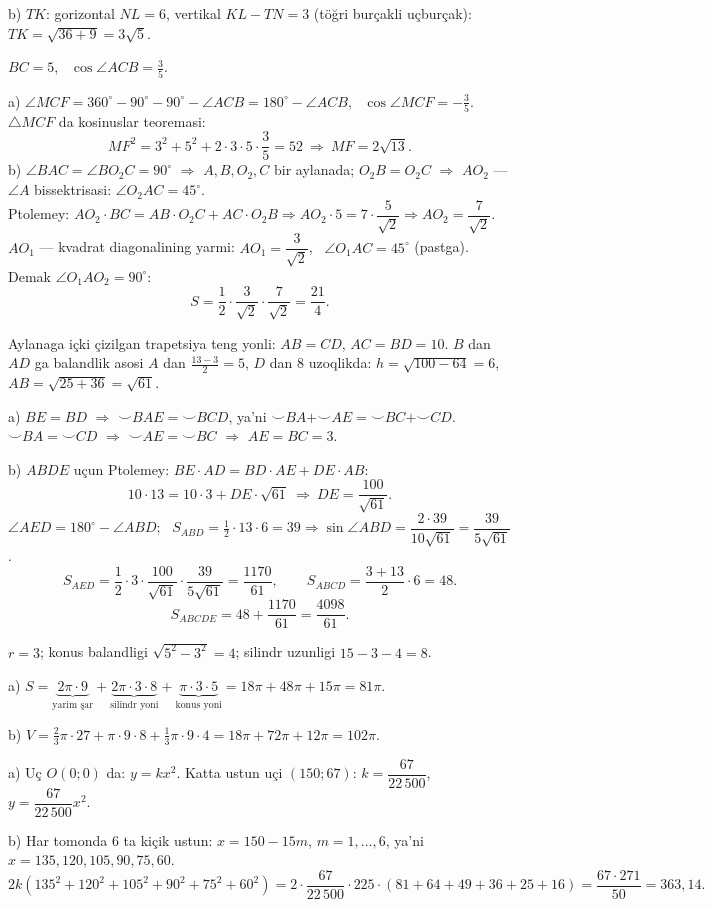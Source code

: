 b) $TK$: gorizontal $NL=6$, vertikal $KL-TN=3$ (\textcolor{aux}{töğri burçakli uçburçak}): \ $TK=\sqrt{36+9}=3\sqrt5$.

\newpage
{}
$BC=5$, \ $\cos\angle ACB=\frac35$.

a) $\angle MCF=360^\circ-90^\circ-90^\circ-\angle ACB=180^\circ-\angle ACB$, \ $\cos\angle MCF=-\frac35$. $\triangle MCF$ da kosinuslar teoremasi:
\[MF^2=3^2+5^2+2\cdot3\cdot5\cdot\frac35=52\ \Rightarrow\ MF=2\sqrt{13}.\]
b) $\angle BAC=\angle BO_2C=90^\circ$ $\Rightarrow$ $A,B,O_2,C$ bir aylanada; $O_2B=O_2C$ $\Rightarrow$ $AO_2$ — $\angle A$ bissektrisasi: $\angle O_2AC=45^\circ$.\\
Ptolemey: $AO_2\cdot BC=AB\cdot O_2C+AC\cdot O_2B\Rightarrow AO_2\cdot5=7\cdot\dfrac5{\sqrt2}\Rightarrow AO_2=\dfrac7{\sqrt2}$.\\
$AO_1$ — kvadrat diagonalining yarmi: $AO_1=\dfrac3{\sqrt2}$, \ $\angle O_1AC=45^\circ$ (pastga). Demak $\angle O_1AO_2=90^\circ$:
\[S=\frac12\cdot\frac3{\sqrt2}\cdot\frac7{\sqrt2}=\frac{21}4.\]

\newpage
{}
Aylanaga içki çizilgan trapetsiya teng yonli: $AB=CD$, $AC=BD=10$. $B$ dan $AD$ ga balandlik asosi $A$ dan $\frac{13-3}2=5$, $D$ dan $8$ uzoqlikda: $h=\sqrt{100-64}=6$, \ $AB=\sqrt{25+36}=\sqrt{61}$.

a) $BE=BD$ $\Rightarrow$ $\smile BAE=\smile BCD$, ya'ni $\smile BA+\smile AE=\smile BC+\smile CD$. $\smile BA=\smile CD$ $\Rightarrow$ $\smile AE=\smile BC$ $\Rightarrow$ $AE=BC=3$.

b) $ABDE$ uçun Ptolemey: $BE\cdot AD=BD\cdot AE+DE\cdot AB$:
\[10\cdot13=10\cdot3+DE\cdot\sqrt{61}\ \Rightarrow\ DE=\frac{100}{\sqrt{61}}.\]
$\angle AED=180^\circ-\angle ABD$; \ $S_{ABD}=\frac12\cdot13\cdot6=39\Rightarrow\sin\angle ABD=\dfrac{2\cdot39}{10\sqrt{61}}=\dfrac{39}{5\sqrt{61}}$.
\[S_{AED}=\frac12\cdot3\cdot\frac{100}{\sqrt{61}}\cdot\frac{39}{5\sqrt{61}}=\frac{1170}{61},\qquad S_{ABCD}=\frac{3+13}2\cdot6=48.\]
\[S_{ABCDE}=48+\frac{1170}{61}=\frac{4098}{61}.\]

\newpage
{}
$r=3$; konus balandligi $\sqrt{5^2-3^2}=4$; silindr uzunligi $15-3-4=8$.

a) $S=\underbrace{2\pi\cdot9}_{\text{yarim şar}}+\underbrace{2\pi\cdot3\cdot8}_{\text{silindr yoni}}+\underbrace{\pi\cdot3\cdot5}_{\text{konus yoni}}=18\pi+48\pi+15\pi=81\pi$.

b) $V=\frac23\pi\cdot27+\pi\cdot9\cdot8+\frac13\pi\cdot9\cdot4=18\pi+72\pi+12\pi=102\pi$.

\newpage
{}
a) Uç $O(0;0)$ da: $y=kx^2$. Katta ustun uçi $(150;67)$: $k=\dfrac{67}{22\,500}$, \ $y=\dfrac{67}{22\,500}x^2$.

b) Har tomonda 6 ta kiçik ustun: $x=150-15m$, $m=1,\dots,6$, ya'ni $x=135,120,105,90,75,60$.
\[2k\left(135^2+120^2+105^2+90^2+75^2+60^2\right)=2\cdot\frac{67}{22\,500}\cdot225\cdot(81+64+49+36+25+16)=\frac{67\cdot271}{50}=363{,}14.\]

\ShowJavoblar

